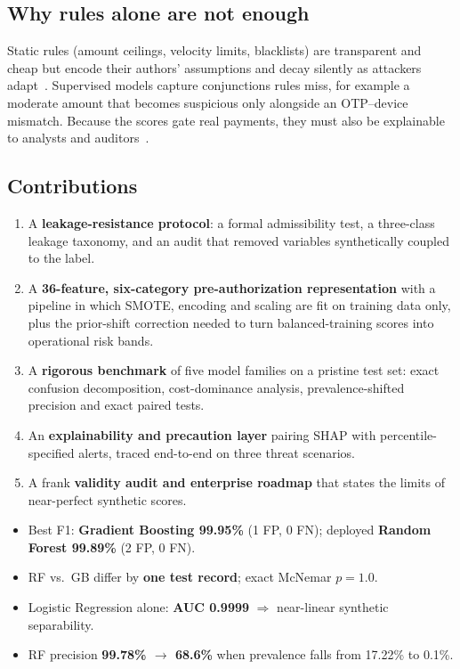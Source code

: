 \documentclass[conference]{IEEEtran}
\begin{document}
\subsection{Why rules alone are not enough}
Static rules (amount ceilings, velocity limits, blacklists) are transparent and cheap but encode their authors' assumptions and decay silently as attackers adapt~\cite{bolton02,chandola09}. Supervised models capture conjunctions rules miss, for example a moderate amount that becomes suspicious only alongside an OTP--device mismatch. Because the scores gate real payments, they must also be explainable to analysts and auditors~\cite{lundberg17,lundberg20}.

\subsection{Contributions}
\begin{enumerate}
\item A \textbf{leakage-resistance protocol}: a formal admissibility test, a three-class leakage taxonomy, and an audit that removed variables synthetically coupled to the label.
\item A \textbf{36-feature, six-category pre-authorization representation} with a pipeline in which SMOTE, encoding and scaling are fit on training data only, plus the prior-shift correction needed to turn balanced-training scores into operational risk bands.
\item A \textbf{rigorous benchmark} of five model families on a pristine test set: exact confusion decomposition, cost-dominance analysis, prevalence-shifted precision and exact paired tests.
\item An \textbf{explainability and precaution layer} pairing SHAP with percentile-specified alerts, traced end-to-end on three threat scenarios.
\item A frank \textbf{validity audit and enterprise roadmap} that states the limits of near-perfect synthetic scores.
\end{enumerate}

\begin{tcolorbox}[colback=navy!5,colframe=navy,boxrule=0.6pt,arc=2pt,left=4pt,right=4pt,top=2pt,bottom=2pt,title={\footnotesize\bfseries Key results at a glance},fonttitle=\footnotesize,coltitle=white]
\footnotesize
\begin{itemize}[leftmargin=1.2em]
\item Best F1: \textbf{Gradient Boosting 99.95\%} (1 FP, 0 FN); deployed \textbf{Random Forest 99.89\%} (2 FP, 0 FN).
\item RF vs.\ GB differ by \textbf{one test record}; exact McNemar $p=1.0$.
\item Logistic Regression alone: \textbf{AUC 0.9999} $\Rightarrow$ near-linear synthetic separability.
\item RF precision \textbf{99.78\% $\rightarrow$ 68.6\%} when prevalence falls from 17.22\% to 0.1\%.
\end{itemize}
\end{tcolorbox}
\end{document}
